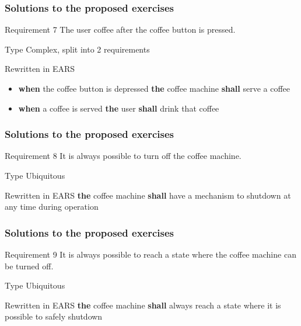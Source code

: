 \documentclass[aspectratio=169]{beamer}
\newcommand{\earsu}[2]{{\bf \color{mypurple}the} {#1} {\bf \color{mypurple}shall} {#2}}
\newcommand{\earse}[3]{{\bf \color{mygreen}when} {#1} {\bf \color{mypurple}the} {#2} {\bf \color{mypurple}shall} {#3}}
\begin{document}
\begin{frame}
  \frametitle{Solutions to the proposed exercises}
  \begin{block}{Requirement 7}
    The user  \alert{coffee} after the \alert{coffee button} is pressed.
  \end{block}
  \begin{block}{Type}
   Complex, split into 2 requirements
  \end{block}
  \begin{block}{Rewritten in EARS}
  \begin{itemize}
    \item \earse{the coffee button is depressed}{coffee machine}{serve a coffee}
    \item \earse{a coffee is served}{user}{drink that coffee}
  \end{itemize}
   
  \end{block}
\end{frame}

\begin{frame}
  \frametitle{Solutions to the proposed exercises}
  \begin{block}{Requirement 8}
    It is always possible to \alert{turn off} the coffee machine.
  \end{block}
  \begin{block}{Type}
   Ubiquitous
  \end{block}
  \begin{block}{Rewritten in EARS}
   \earsu{coffee machine}{have a mechanism to shutdown at any time during operation}
  \end{block}
\end{frame}

\begin{frame}
  \frametitle{Solutions to the proposed exercises}
  \begin{block}{Requirement 9}
    It is always possible to reach a state where the coffee machine can be \alert{turned off}.
  \end{block}
  \begin{block}{Type}
   Ubiquitous
  \end{block}
  \begin{block}{Rewritten in EARS}
   \earsu{coffee machine}{always reach a state where it is possible to safely shutdown}
  \end{block}
\end{frame}
\end{document}
